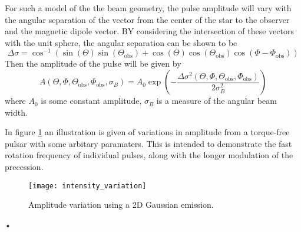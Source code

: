 \documentclass[../full_thesis/full_thesis.tex]{subfiles}
\begin{document}
For such a model of the the beam geometry, the pulse amplitude will vary with the
angular separation of the vector from the center of the star to the observer and the
magnetic dipole vector. BY considering the intersection of these vectors with
the unit sphere, the angular separation can be shown to be
\newcommand{\ThetaO}{\Theta_{\mathrm{obs}}}
\newcommand{\PhiO}{\Phi_{\mathrm{obs}}}
\newcommand{\sigmaB}{\sigma_{B}}
\begin{equation}
\Delta\sigma = \cos^{-1}\left(\sin(\Theta)\sin(\ThetaO) +
                             \cos(\Theta)\cos(\ThetaO)\cos(\Phi - \PhiO)\right)
\label{eqn: angular sep inv cos}
\end{equation}
Then the amplitude of the pulse will be given by
\begin{equation}
A(\Theta, \Phi, \ThetaO, \PhiO, \sigmaB) =
A_{0} \exp\left(-\frac{\Delta\sigma^{2}(\Theta, \Phi, \ThetaO, \PhiO)}{2\sigmaB^{2}}\right)
\label{eqn: beam amplitude}
\end{equation}
where $A_{0}$ is some constant amplitude, $\sigmaB$ is a measure of the
angular beam width.

In figure \ref{fig: amplitude variation} an illustration is given of variations
in amplitude from a torque-free pulsar with some arbitary paramaters. This is
intended to demonstrate the fast rotation frequency of individual pulses, along
with the longer modulation of the precession.
\begin{figure}[htb]
\centering
\texttt{[image: intensity\_variation]}
\caption{Amplitude variation using a 2D Gaussian emission.}
\label{fig: amplitude variation}
\end{figure}•


\biblio
\end{document}
